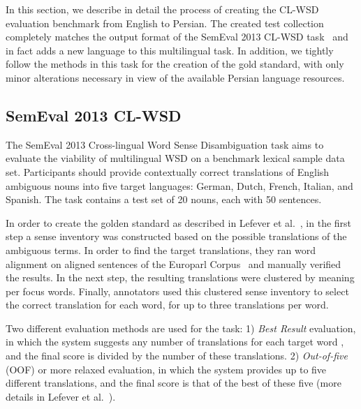 In this section, we describe in detail the process of creating the CL-WSD evaluation benchmark from English to Persian. The created test collection completely matches the output format of the SemEval 2013 CL-WSD task~\cite{lefever2013semeval} and in fact adds a new language to this multilingual task. In addition, we tightly follow the methods in this task for the creation of the gold standard, with only minor alterations necessary in view of the available Persian language resources.    

\vspace{-0.2cm}
\subsection{SemEval 2013 CL-WSD}
The SemEval 2013 Cross-lingual Word Sense Disambiguation task aims to evaluate the viability of multilingual WSD on a benchmark lexical sample data set. Participants should provide contextually correct translations of English ambiguous nouns into five target languages: German, Dutch, French, Italian, and Spanish. The task contains a test set of 20 nouns, each with 50 sentences. 


In order to create the golden standard as described in Lefever et al.~, in the first step a sense inventory was constructed based on the possible translations of the ambiguous terms. In order to find the target translations, they ran word alignment on aligned sentences of the Europarl Corpus~\cite{europarl} and manually verified the results. In the next step, the resulting translations were clustered by meaning per focus words. Finally, annotators used this clustered sense inventory to select the correct translation for each word, for up to three translations per word. %

Two different evaluation methods are used for the task: 1) \emph{Best Result} evaluation, in which the system suggests any number of translations for each target word%
, and the final score is divided by the number of these translations. 2) \emph{Out-of-five} (OOF) or more relaxed evaluation, in which the system provides up to five different translations, and the final score is that of the best of these five (more details in Lefever et al.~).

